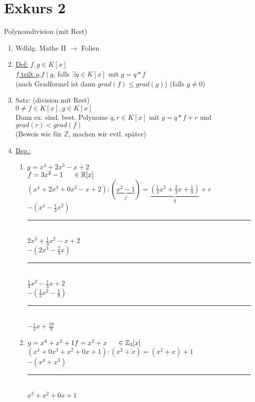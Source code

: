 \documentclass[a4paper,11pt]{article}
\newcommand{\hsp}{\hspace{5mm}}
\begin{document}
\section*{Exkurs 2}
Polynomdivision (mit Rest)
\begin{enumerate}[label=\arabic*)]
	\item Wdhlg. Mathe II $\rightarrow$ Folien
	\item \underline{Def:} $f,g\in K[x]$ \\
	\underline{$f$ teilt $g$},\hsp $f\mid g$, falls $\exists q\in K[x]$ mit $g=q*f$ \\
	(nach Gradformel ist dann $grad(f)\leq grad(g)$) (falls $g\neq0$)
	\item Satz: (division mit Rest) \\
	$0\neq f\in K[x],g\in K[x]$ \\
	Dann ex. eind. best. Polynome $q,r\in K[x]$ mit $g=q*f+r$ und $grad(r)<grad(f)$ \\
	(Beweis wie für $\mathbb{Z}$, machen wir evtl. später) \\
	\item \underline{Bsp.:}
		\begin{enumerate}[label=\alph*)]
			\item $g=x^4+2x^3-x+2$ \\
			$f=3x^2-1\hsp\in\mathbb{R}[x]$ \\
			$(x^4+2x^3+0x^2-x+2):(\underbrace{x^2-1}_{f})=\underbrace{(\frac{1}{3}x^2+\frac{2}{3}x+\frac{1}{9})}_{q}+r$ \\
			$-(x^4-\frac{1}{3}x^2)$ \\
			\rule{3cm}{1pt} \\
			$2x^3+\frac{1}{3}x^2-x+2$ \\
			$-(2x^3-\frac{2}{3}x)$ \\
			\rule{3cm}{1pt} \\
			$\frac{1}{3}x^2-\frac{1}{3}x+2$ \\
			$-(\frac{1}{3}x^2-\frac{1}{9})$ \\
			\rule{3cm}{1pt} \\
			$-\frac{1}{3}x+\frac{19}{9}$
			\item $g=x^4+x^2+1 \\
			f=x^2+x\hsp\in\mathbb{Z}_2[x]$ \\
			$(x^4+0x^3+x^2+0x+1):(x^2+x)=(x^2+x)+1$ \\
			$-(x^4+x^3)$ \\
			\rule{3cm}{1pt} \\
			$x^3+x^2+0x+1$ \\

\end{enumerate}
\end{enumerate}
\end{document}

